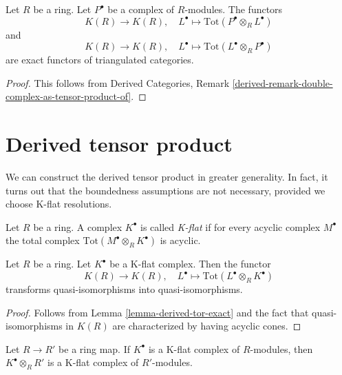 \begin{lemma}
\label{lemma-derived-tor-exact}
Let $R$ be a ring. Let $P^\bullet$ be a complex of $R$-modules.
The functors
$$
K(R) \longrightarrow K(R), \quad
L^\bullet \longmapsto \text{Tot}(P^\bullet \otimes_R L^\bullet)
$$
and
$$
K(R) \longrightarrow K(R), \quad
L^\bullet \longmapsto \text{Tot}(L^\bullet \otimes_R P^\bullet)
$$
are exact functors of triangulated categories.
\end{lemma}

\begin{proof}
This follows from Derived Categories, Remark
\ref{derived-remark-double-complex-as-tensor-product-of}.
\end{proof}




\section{Derived tensor product}
\label{section-derived-tensor-product}

\noindent
We can construct the derived tensor product in greater generality.
In fact, it turns out that the boundedness assumptions are not
necessary, provided we choose K-flat resolutions.

\begin{definition}
\label{definition-K-flat}
Let $R$ be a ring. A complex $K^\bullet$ is called {\it K-flat}
if for every acyclic complex $M^\bullet$ the total complex
$\text{Tot}(M^\bullet \otimes_R K^\bullet)$ is acyclic.
\end{definition}

\begin{lemma}
\label{lemma-K-flat-quasi-isomorphism}
Let $R$ be a ring. Let $K^\bullet$ be a K-flat complex.
Then the functor
$$
K(R) \longrightarrow K(R), \quad
L^\bullet \longmapsto \text{Tot}(L^\bullet \otimes_R K^\bullet)
$$
transforms quasi-isomorphisms into quasi-isomorphisms.
\end{lemma}

\begin{proof}
Follows from
Lemma \ref{lemma-derived-tor-exact}
and the fact that quasi-isomorphisms in $K(R)$
are characterized by having acyclic cones.
\end{proof}

\begin{lemma}
\label{lemma-base-change-K-flat}
Let $R \to R'$ be a ring map. If $K^\bullet$ is a K-flat complex
of $R$-modules, then $K^\bullet \otimes_R R'$ is a K-flat complex
of $R'$-modules.
\end{lemma}

